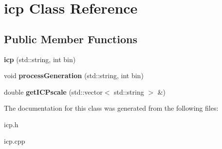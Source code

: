 \hypertarget{classicp}{}\section{icp Class Reference}
\label{classicp}
\subsection*{Public Member Functions}
\begin{DoxyCompactItemize}
\item 
\mbox{\label{classicp_a16dfbc3ddb18a613cfd4fb8861d0c16a}} 
{\bfseries icp} (std\+::string, int bin)
\item 
\mbox{\label{classicp_aca508e79450dce34131b83ed2a4a1d95}} 
void {\bfseries process\+Generation} (std\+::string, int bin)
\item 
\mbox{\label{classicp_af5adbefb80bcd764306af7361e2a532a}} 
double {\bfseries get\+I\+C\+Pscale} (std\+::vector$<$ std\+::string $>$ \&)
\end{DoxyCompactItemize}


The documentation for this class was generated from the following files\+:\begin{DoxyCompactItemize}
\item 
icp.\+h\item 
icp.\+cpp\end{DoxyCompactItemize}
